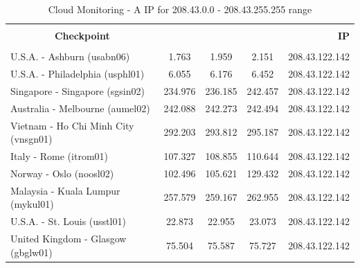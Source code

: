 \documentclass[a4paper,11pt]{book}
\begin{document}
\begin{table}
\label{table:Monitoring_4}
\begin{tabular}{|l|c|c|c|r|}
\hline
\multicolumn{1}{|c|}{\textbf{}} & {\textbf{}} & {\textbf{}} & {\textbf{}} & {\textbf{}}\\
\multicolumn{1}{|c|}{\textbf{Checkpoint}} & {\textbf{RTT minimo} & {\textbf{RTT medio} & {\textbf{RTT massimo} & {\textbf{IP}}\\
\multicolumn{1}{|c|}{\textbf{}} & {\textbf{}} & {\textbf{}} & {\textbf{}} & {\textbf{}}\\
\hline
U.S.A. - Ashburn (usabn06) & 1.763 & 1.959 & 2.151 & 208.43.122.142\\
U.S.A. - Philadelphia (usphl01) & 6.055 & 6.176 & 6.452 & 208.43.122.142\\
Singapore - Singapore (sgsin02) & 234.976 & 236.185 & 242.457 & 208.43.122.142\\
Australia - Melbourne (aumel02) & 242.088 & 242.273 & 242.494 & 208.43.122.142\\
Vietnam - Ho Chi Minh City (vnsgn01) & 	292.203 & 293.812 & 295.187 & 208.43.122.142\\
Italy - Rome (itrom01) & 107.327 & 108.855 & 110.644 & 208.43.122.142\\
Norway - Oslo (noosl02) & 102.496 & 105.621 & 129.432 & 208.43.122.142\\
Malaysia - Kuala Lumpur (mykul01) & 257.579 & 259.167 & 262.955 & 208.43.122.142\\
U.S.A. - St. Louis (usstl01) & 22.873 & 22.955 & 23.073 & 208.43.122.142\\
United Kingdom - Glasgow (gbglw01) & 75.504 & 75.587 & 75.727 & 208.43.122.142\\
\hline
\end{tabular}
\caption{Cloud Monitoring - A IP for 208.43.0.0 - 208.43.255.255 range}
\end{table}

~
\end{document}
